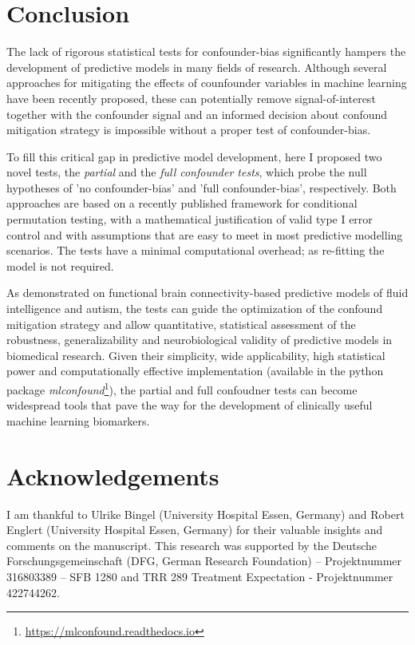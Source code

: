 \documentclass{article}
\begin{document}
\section{Conclusion}

The lack of rigorous statistical tests for confounder-bias significantly hampers the development of predictive models in many fields of research. Although several approaches for mitigating the effects of counfounder variables in machine learning have been recently proposed, these can potentially remove signal-of-interest together with the confounder signal and an informed decision about confound mitigation strategy is impossible without a proper test of confounder-bias.

To fill this critical gap in predictive model development, here I proposed two novel tests, the \emph{partial} and the \emph{full confounder tests}, which probe the null hypotheses of 'no confounder-bias' and 'full confounder-bias', respectively. Both approaches are based on a recently published framework for conditional permutation testing, with a mathematical justification of valid type I error control and with assumptions that are easy to meet in most predictive modelling scenarios. The tests have a minimal computational overhead; as re-fitting the model is not required.

As demonstrated on functional brain connectivity-based predictive models of fluid intelligence and autism, the tests can guide the optimization of the confound mitigation strategy and allow quantitative, statistical assessment of the robustness, generalizability and neurobiological validity of predictive models in biomedical research.
Given their simplicity, wide applicability, high statistical power and computationally effective implementation (available in the  python package \emph{mlconfound}\footnote{\href{https://mlconfound.readthedocs.io}{https://mlconfound.readthedocs.io}}), the partial and full confoudner tests can become widespread tools that pave the way for the development of clinically useful machine learning biomarkers.

\section{Acknowledgements}
I am thankful to Ulrike Bingel (University Hospital Essen, Germany) and Robert Englert (University Hospital Essen, Germany) for their valuable insights and comments on the manuscript. This research was supported by the Deutsche Forschungsgemeinschaft (DFG, German Research Foundation) – Projektnummer 316803389 – SFB 1280  and TRR 289 Treatment Expectation - Projektnummer 422744262.
\end{document}
